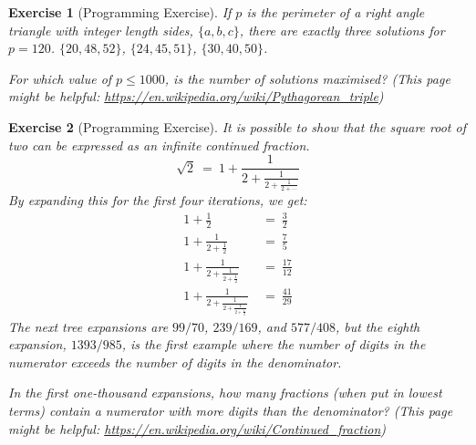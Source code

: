 \documentclass[11pt]{amsart}
\theoremstyle{theorem}
\newtheorem{exercise}{Exercise}
\begin{document}
\begin{exercise}[Programming Exercise]
If $p$ is the perimeter of a right angle triangle with integer length sides, $\{a,b,c\}$, there are exactly three solutions for $p=120$. $\{20,48,52\}$, $\{24,45,51\}$, $\{30,40,50\}$.

For which value of $p\leq 1000$, is the number of solutions maximised? (This page might be helpful: \url{https://en.wikipedia.org/wiki/Pythagorean_triple})
\end{exercise}

\begin{exercise}[Programming Exercise]
It is possible to show that the square root of two can be expressed as an infinite continued fraction.
\[
\sqrt{2} \ = \ 1+\frac{1}{2+\frac{1}{2+\frac{1}{2+\cdots}}}
\]
By expanding this for the first four iterations, we get:
\begin{align*}
1+\frac{1}{2} \ &= \ \frac{3}{2} \\
1+\frac{1}{2+\frac{1}{2}} \ &= \ \frac{7}{5} \\
1+\frac{1}{2+\frac{1}{2+\frac{1}{2}}} \ &= \ \frac{17}{12} \\
1+\frac{1}{2+\frac{1}{2+\frac{1}{2+\frac{1}{2}}}} \ &= \ \frac{41}{29}
\end{align*}
The next tree expansions are $99/70$, $239/169$, and $577/408$, but the eighth expansion, $1393/985$, is the first example where the number of digits in the numerator exceeds the number of digits in the denominator.

In the first one-thousand expansions, how many fractions (when put in lowest terms) contain a numerator with more digits than the denominator? (This page might be helpful: \url{https://en.wikipedia.org/wiki/Continued_fraction})
\end{exercise}
\end{document}
